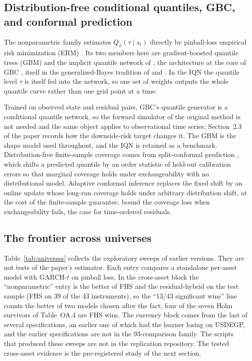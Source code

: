 \documentclass[11pt]{article}
\begin{document}
\subsection*{Distribution-free conditional quantiles, GBC, and conformal prediction}
The nonparametric family estimates $Q_\phi(\tau \mid s_t)$ directly by pinball-loss empirical risk minimization (ERM) \citep{koenker1978, steinwart2011}. Its two members here are gradient-boosted quantile trees (GBM) \citep{friedman2001} and the implicit quantile network of \citet{dabney2018iqn}, the architecture at the core of GBC \citep{polson2023gbc, nareklishvili2025gqbp}, itself in the generalized-Bayes tradition of \citet{jiang2008gibbs} and \citet{bissiri2016general}. In the IQN the quantile level $\tau$ is itself fed into the network, so one set of weights outputs the whole quantile curve rather than one grid point at a time.

Trained on observed state and residual pairs, GBC's quantile generator is a conditional quantile network, so the forward simulator of the original method is not needed and the same object applies to observational time series; Section~2.3 of the paper records how the downside-risk target changes it. The GBM is the shape model used throughout, and the IQN is retained as a benchmark. Distribution-free finite-sample coverage comes from split-conformal prediction \citep{vovk2005, lei2018, romano2019cqr}, which shifts a predicted quantile by an order statistic of held-out calibration errors so that marginal coverage holds under exchangeability with no distributional model. Adaptive conformal inference \citep{gibbs2021aci} replaces the fixed shift by an online update whose long-run coverage holds under arbitrary distribution shift, at the cost of the finite-sample guarantee. \citet{barber2023} bound the coverage loss when exchangeability fails, the case for time-ordered residuals.

\subsection*{The frontier across universes}
Table~\ref{tab:universes} collects the exploratory sweeps of earlier versions. They are not tests of the paper's estimator. Each entry compares a standalone per-asset model with GARCH-$t$ on pinball loss. In the cross-asset block the ``nonparametric'' entry is the better of FHS and the residual-hybrid on the test sample (FHS on 39 of the 43 instruments), so the ``13/43 significant wins'' line counts the better of two models chosen after the fact; four of the seven Holm survivors of Table~OA.4 are FHS wins. The currency block comes from the last of several specifications, an earlier one of which had the learner losing on USDEGP, and the earlier specifications are not in the 93-comparison family. The scripts that produced these sweeps are not in the replication repository. The tested cross-asset evidence is the pre-registered study of the next section.
\end{document}
